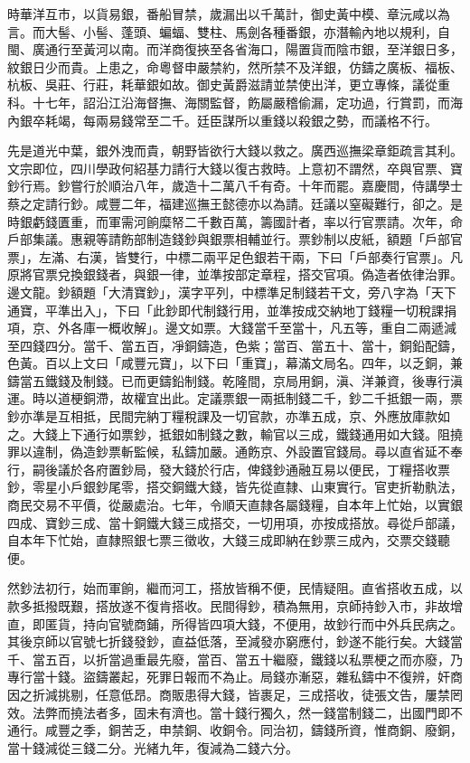 \begin{pinyinscope}
時華洋互市，以貨易銀，番船冒禁，歲漏出以千萬計，御史黃中模、章沅咸以為言。而大髻、小髻、蓬頭、蝙蝠、雙柱、馬劍各種番銀，亦潛輸內地以規利，自閩、廣通行至黃河以南。而洋商復挾至各省海口，陽置貨而陰市銀，至洋銀日多，紋銀日少而貴。上患之，命粵督申嚴禁約，然所禁不及洋銀，仿鑄之廣板、福板、杭板、吳莊、行莊，耗華銀如故。御史黃爵滋請並禁使出洋，更立專條，議從重科。十七年，詔沿江沿海督撫、海關監督，飭屬嚴稽偷漏，定功過，行賞罰，而海內銀卒耗竭，每兩易錢常至二千。廷臣謀所以重錢以殺銀之勢，而議格不行。

先是道光中葉，銀外洩而貴，朝野皆欲行大錢以救之。廣西巡撫梁章鉅疏言其利。文宗即位，四川學政何紹基力請行大錢以復古救時。上意初不謂然，卒與官票、寶鈔行焉。鈔嘗行於順治八年，歲造十二萬八千有奇。十年而罷。嘉慶間，侍講學士蔡之定請行鈔。咸豐二年，福建巡撫王懿德亦以為請。廷議以窒礙難行，卻之。是時銀虧錢匱重，而軍需河餉糜帑二千數百萬，籌國計者，率以行官票請。次年，命戶部集議。惠親等請飭部制造錢鈔與銀票相輔並行。票鈔制以皮紙，額題「戶部官票」，左滿、右漢，皆雙行，中標二兩平足色銀若干兩，下曰「戶部奏行官票」。凡原將官票兌換銀錢者，與銀一律，並準按部定章程，搭交官項。偽造者依律治罪。邊文龍。鈔額題「大清寶鈔」，漢字平列，中標準足制錢若干文，旁八字為「天下通寶，平準出入」，下曰「此鈔即代制錢行用，並準按成交納地丁錢糧一切稅課捐項，京、外各庫一概收解」。邊文如票。大錢當千至當十，凡五等，重自二兩遞減至四錢四分。當千、當五百，凈銅鑄造，色紫；當百、當五十、當十，銅鉛配鑄，色黃。百以上文曰「咸豐元寶」，以下曰「重寶」，幕滿文局名。四年，以乏銅，兼鑄當五鐵錢及制錢。已而更鑄鉛制錢。乾隆間，京局用銅，滇、洋兼資，後專行滇運。時以道梗銅滯，故權宜出此。定議票銀一兩抵制錢二千，鈔二千抵銀一兩，票鈔亦準是互相抵，民間完納丁糧稅課及一切官款，亦準五成，京、外應放庫款如之。大錢上下通行如票鈔，抵銀如制錢之數，輸官以三成，鐵錢通用如大錢。阻撓罪以違制，偽造鈔票斬監候，私鑄加嚴。通飭京、外設置官錢局。尋以直省延不奉行，嗣後議於各府置鈔局，發大錢於行店，俾錢鈔通融互易以便民，丁糧搭收票鈔，零星小戶銀鈔尾零，搭交銅鐵大錢，皆先從直隸、山東實行。官吏折勒骫法，商民交易不平價，從嚴處治。七年，令順天直隸各屬錢糧，自本年上忙始，以實銀四成、寶鈔三成、當十銅鐵大錢三成搭交，一切用項，亦按成搭放。尋從戶部議，自本年下忙始，直隸照銀七票三徵收，大錢三成即納在鈔票三成內，交票交錢聽便。

然鈔法初行，始而軍餉，繼而河工，搭放皆稱不便，民情疑阻。直省搭收五成，以款多抵撥既艱，搭放遂不復肯搭收。民間得鈔，積為無用，京師持鈔入市，非故增直，即匿貨，持向官號商鋪，所得皆四項大錢，不便用，故鈔行而中外兵民病之。其後京師以官號七折錢發鈔，直益低落，至減發亦窮應付，鈔遂不能行矣。大錢當千、當五百，以折當過重最先廢，當百、當五十繼廢，鐵錢以私票梗之而亦廢，乃專行當十錢。盜鑄叢起，死罪日報而不為止。局錢亦漸惡，雜私鑄中不復辨，奸商因之折減挑剔，任意低昂。商販患得大錢，皆裹足，三成搭收，徒張文告，屢禁罔效。法弊而撓法者多，固未有濟也。當十錢行獨久，然一錢當制錢二，出國門即不通行。咸豐之季，銅苦乏，申禁銅、收銅令。同治初，鑄錢所資，惟商銅、廢銅，當十錢減從三錢二分。光緒九年，復減為二錢六分。


\end{pinyinscope}
